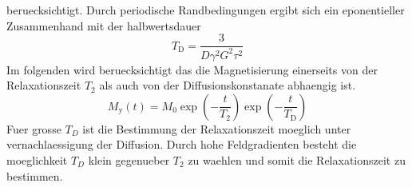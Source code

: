 beruecksichtigt. Durch periodische Randbedingungen ergibt sich ein eponentieller
Zusammenhand mit der halbwertsdauer
\begin{equation}
		T_\text{D} = \frac{3}{D \gamma^2 G^2 \tau^2}
\end{equation}
Im folgenden wird beruecksichtigt das die Magnetisierung einerseits von der
Relaxationszeit $T_2$ als auch von der Diffusionskonstanate abhaengig ist.
\begin{equation}
		\label{eq:my}
		M_\text{y}(t) = M_0 \exp \left( - \frac{t}{T_2} \right) \exp \left( -
		\frac{t}{T_\text{D}} \right)
\end{equation}
Fuer grosse $T_D$ ist die Bestimmung der Relaxationszeit moeglich unter
vernachlaessigung der Diffusion. 
Durch hohe Feldgradienten besteht die moeglichkeit $T_D$ klein gegenueber $T_2$
zu waehlen und somit die Relaxationszeit zu bestimmen. 
